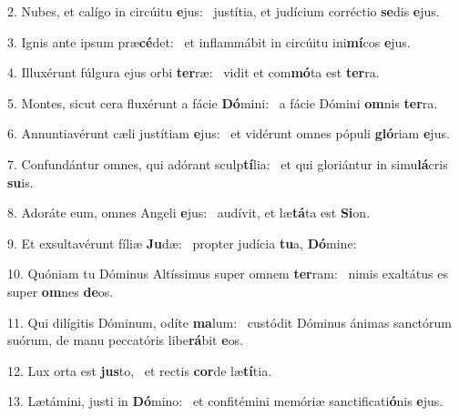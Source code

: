 2. Nubes, et calígo in circúitu \textbf{e}jus: \ast\  justítia, et judícium corréctio \textbf{se}dis \textbf{e}jus.\

3. Ignis ante ipsum præ\textbf{cé}det: \ast\  et inflammábit in circúitu ini\textbf{mí}cos \textbf{e}jus.\

4. Illuxérunt fúlgura ejus orbi \textbf{ter}ræ: \ast\  vidit et com\textbf{mó}ta est \textbf{ter}ra.\

5. Montes, sicut cera fluxérunt a fácie \textbf{Dó}mini: \ast\  a fácie Dómini \textbf{om}nis \textbf{ter}ra.\

6. Annuntiavérunt cæli justítiam \textbf{e}jus: \ast\  et vidérunt omnes pópuli \textbf{gló}riam \textbf{e}jus.\

7. Confundántur omnes, qui adórant sculp\textbf{tí}lia: \ast\  et qui gloriántur in simu\textbf{lá}cris \textbf{su}is.\

8. Adoráte eum, omnes Angeli \textbf{e}jus: \ast\  audívit, et læ\textbf{tá}ta est \textbf{Si}on.\

9. Et exsultavérunt fíliæ \textbf{Ju}dæ: \ast\  propter judícia \textbf{tu}a, \textbf{Dó}mine:\

10. Quóniam tu Dóminus Altíssimus super omnem \textbf{ter}ram: \ast\  nimis exaltátus es super \textbf{om}nes \textbf{de}os.\

11. Qui dilígitis Dóminum, odíte \textbf{ma}lum: \ast\  custódit Dóminus ánimas sanctórum suórum, de manu peccatóris libe\textbf{rá}bit \textbf{e}os.\

12. Lux orta est \textbf{jus}to, \ast\  et rectis \textbf{cor}de læ\textbf{tí}tia.\

13. Lætámini, justi in \textbf{Dó}mino: \ast\  et confitémini memóriæ sanctificati\textbf{ó}nis \textbf{e}jus.\

